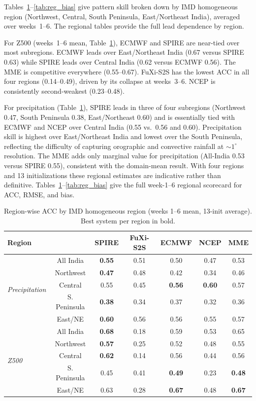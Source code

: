 \documentclass[11pt,a4paper]{article}
\begin{document}
Tables~\ref{tab:reg_pcc}--\ref{tab:reg_bias} give pattern skill broken
down by IMD homogeneous region (Northwest, Central, South Peninsula,
East/Northeast India), averaged over weeks~1--6.
The regional tables provide the full lead dependence by region.

For Z500 (weeks~1--6 mean, Table~\ref{tab:reg_pcc}), ECMWF and SPIRE
are near-tied over most subregions. ECMWF leads over East/Northeast
India (0.67 versus SPIRE 0.63) while SPIRE leads over Central India
(0.62 versus ECMWF 0.56). The MME is competitive everywhere
(0.55--0.67). FuXi-S2S has the lowest ACC in all four regions
(0.14--0.49), driven by its collapse at weeks~3--6. NCEP is
consistently second-weakest (0.23--0.48).

For precipitation (Table~\ref{tab:reg_pcc}), SPIRE leads in three of
four subregions (Northwest 0.47, South Peninsula 0.38, East/Northeast
0.60) and is essentially tied with ECMWF and NCEP over Central India
(0.55 vs.\ 0.56 and 0.60). Precipitation skill is highest over
East/Northeast India and lowest over the South Peninsula, reflecting the
difficulty of capturing orographic and convective rainfall at
$\sim1^\circ$ resolution. The MME adds only marginal value for
precipitation (All-India 0.53 versus SPIRE 0.55), consistent with the
domain-mean result. With four regions and 13 initializations these
regional estimates are indicative rather than definitive.
Tables~\ref{tab:reg_pcc}--\ref{tab:reg_bias} give the full week-1--6
regional scorecard for ACC, RMSE, and bias.

\begin{table}[t]\centering
\small
\setlength{\tabcolsep}{5pt}
\caption{Region-wise ACC by IMD homogeneous region (weeks 1--6 mean,
13-init average). Best system per region in bold.}\label{tab:reg_pcc}
\begin{tabular}{lcccccc}\toprule
Region & & SPIRE & FuXi-S2S & ECMWF & NCEP & MME \\
\midrule
\multirow{5}{*}{\emph{Precipitation}} &
All India    & \textbf{0.55} & 0.51 & 0.50 & 0.47 & 0.53 \\
& Northwest    & \textbf{0.47} & 0.48 & 0.42 & 0.34 & 0.46 \\
& Central      & 0.55 & 0.45 & \textbf{0.56} & \textbf{0.60} & 0.57 \\
& S. Peninsula & \textbf{0.38} & 0.34 & 0.37 & 0.32 & 0.36 \\
& East/NE      & \textbf{0.60} & 0.56 & 0.56 & 0.55 & 0.57 \\
\midrule
\multirow{5}{*}{\emph{Z500}} &
All India    & \textbf{0.68} & 0.18 & 0.59 & 0.53 & 0.65 \\
& Northwest    & \textbf{0.57} & 0.25 & 0.52 & 0.48 & 0.55 \\
& Central      & \textbf{0.62} & 0.14 & 0.56 & 0.44 & 0.56 \\
& S. Peninsula & 0.45 & 0.41 & \textbf{0.49} & 0.23 & \textbf{0.48} \\
& East/NE      & 0.63 & 0.28 & \textbf{0.67} & 0.48 & \textbf{0.67} \\
\bottomrule
\end{tabular}\end{table}
\end{document}
